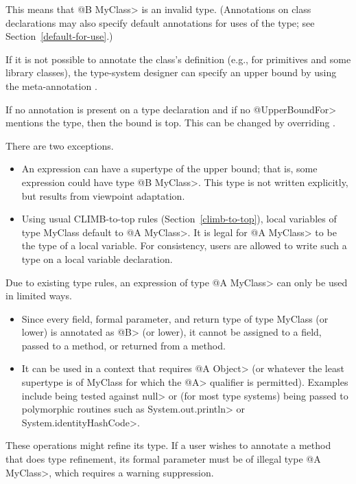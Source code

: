 This means that \<@B MyClass> is an invalid type.  (Annotations on class declarations may also specify
default annotations for uses of the type; see Section~\ref{default-for-use}.)

If it is not possible to annotate the class's definition (e.g., for
primitives and some library classes),
the type-system designer can specify an upper bound by using the meta-annotation
.

If no annotation is present on a type declaration and if no \<@UpperBoundFor> mentions the type, then
the bound is top. This can be changed by overriding
.

There are two exceptions.
\begin{itemize}
  \item
  An expression can have a supertype of the upper bound; that is, some expression could
  have type \<@B MyClass>.  This type is not written explicitly, but results from viewpoint adaptation.
  \item
  Using usual CLIMB-to-top rules (Section~\ref{climb-to-top}),
  local variables of type MyClass default to \<@A MyClass>.
  It is legal for \<@A MyClass> to be the type of a local variable.
  For consistency, users are allowed to write such a type on a local variable declaration.
\end{itemize}

Due to existing type rules, an expression of type \<@A MyClass> can only be used in limited ways.
\begin{itemize}
  \item
  Since every field, formal parameter, and return type of type MyClass (or lower) is annotated as
  \<@B> (or lower), it cannot be assigned to a field, passed to a method, or returned from a method.
  \item
  It can be used in a context that requires \<@A Object> (or whatever the least supertype is of MyClass
  for which the \<@A> qualifier is permitted).  Examples include being tested against \<null> or
  (for most type systems) being passed to polymorphic routines such as \<System.out.println> or \<System.identityHashCode>.
\end{itemize}

These operations might refine its type.  If a user wishes to annotate a method that does type refinement,
its formal parameter must be of illegal type \<@A MyClass>, which requires a warning suppression.

